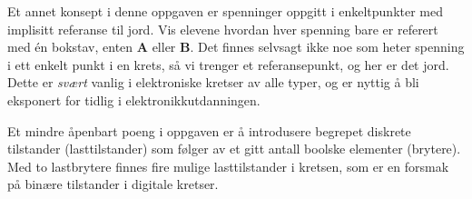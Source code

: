 Et annet konsept i denne oppgaven er spenninger oppgitt i enkeltpunkter med implisitt referanse til jord.  Vis elevene hvordan hver spenning bare er referert med én bokstav, enten {\bf A} eller {\bf B}.  Det finnes selvsagt ikke noe som heter spenning i ett enkelt punkt i en krets, så vi trenger et referansepunkt, og her er det jord.  Dette er {\it svært} vanlig i elektroniske kretser av alle typer, og er nyttig å bli eksponert for tidlig i elektronikkutdanningen.

Et mindre åpenbart poeng i oppgaven er å introdusere begrepet diskrete tilstander (lasttilstander) som følger av et gitt antall boolske elementer (brytere).  Med to lastbrytere finnes fire mulige lasttilstander i kretsen, som er en forsmak på binære tilstander i digitale kretser.



